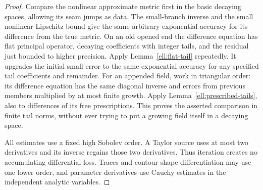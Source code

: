 \begin{proof}
Compare the nonlinear approximate metric first in the basic
decaying spaces, allowing its seam jumps as data.  The
small-branch inverse and the small nonlinear Lipschitz bound
give the same arbitrary exponential accuracy for its difference
from the true metric.  On an old opened end the difference
equation has flat principal operator, decaying coefficients
with integer tails, and the residual just bounded to higher
precision.  Apply Lemma~\ref{ell:flat-tail} repeatedly.  It
upgrades the initial small error to the same exponential
accuracy for any specified tail coefficients and remainder.
For an appended field, work in triangular order: its difference
equation has the same diagonal inverse and errors from previous
members multiplied by at most finite growth.  Apply
Lemma~\ref{ell:prescribed-tails}, also to differences of its
free prescriptions.  This proves the asserted comparison in
finite tail norms, without ever trying to put a growing
field itself in a decaying space.

All estimates use a fixed high Sobolev order.  A Taylor source
uses at most two derivatives and its inverse regains those
two derivatives.  Thus iteration creates no accumulating
differential loss.  Traces and contour shape differentiation
may use one lower order, and parameter derivatives use Cauchy
estimates in the independent analytic variables.
\end{proof}

